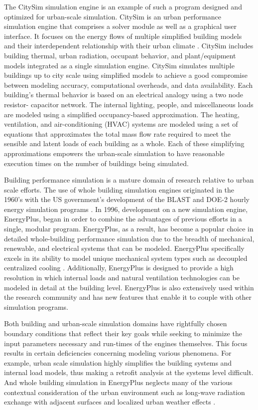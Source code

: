 \documentclass{tBPS2e}
\theoremstyle{plain}
\theoremstyle{definition}
\theoremstyle{remark}
\begin{document}
The CitySim simulation engine is an example of such a program designed and
optimized for urban-scale simulation. CitySim is an urban performance
simulation engine that comprises a solver module as well as a graphical user
interface. It focuses on the energy flows of multiple simplified building
models and their interdependent relationship with their urban climate
\citep{robinson_citysim:_2009}. CitySim includes building thermal, urban radiation,
occupant behavior, and plant/equipment models integrated as a single
simulation engine. CitySim simulates multiple buildings up to city scale using
simplified models to achieve a good compromise between modeling
accuracy, computational overheads, and data availability. Each building's
thermal behavior is based on an electrical analogy using a two node resistor-
capacitor network. The internal lighting, people, and miscellaneous loads are
modeled using a simplified occupancy-based approximation. The heating,
ventilation, and air-conditioning (HVAC) systems are modeled using a
set of equations that approximates the total mass flow rate required to meet the
sensible and latent loads of each building as a whole. Each of these
simplifying approximations empowers the urban-scale simulation to have
reasonable execution times on the number of buildings being
simulated.

Building performance simulation is a mature domain of research relative to
urban scale efforts. The use of whole building simulation engines originated
in the 1960's with the US government's development of the BLAST and DOE-2
hourly energy simulation programs \citep{lawrie_energyplus:_2001}. In 1996, development
on a new simulation engine, EnergyPlus, began in order to combine the
advantages of previous efforts in a single, modular program. EnergyPlus, as a
result, has become a popular choice in detailed whole-building performance
simulation due to the breadth of mechanical, renewable, and electrical systems
that can be modeled. EnergyPlus specifically excels in its ability to model
unique mechanical system types such as decoupled centralized cooling
\citep{miller_modeling_2010}. Additionally, EnergyPlus is designed to provide a high
resolution in which internal loads and natural ventilation technologies can be
modeled in detail at the building level. EnergyPlus is also extensively used within the
research community and has new features that enable it to couple with other simulation programs.

Both building and urban-scale simulation domains have rightfully chosen
boundary conditions that reflect their key goals while seeking to minimize the
input parameters necessary and run-times of the engines themselves. This focus
results in certain deficiencies concerning modeling various phenomena.
For example, urban scale simulation highly simplifies the building systems and
internal load models, thus making a retrofit analysis at the systems level
difficult. And whole building simulation in EnergyPlus neglects many of the
various contextual consideration of the urban environment such as long-wave
radiation exchange with adjacent surfaces and localized urban weather effects
\citep{lawrie_energyplus:_2001}.
\end{document}
